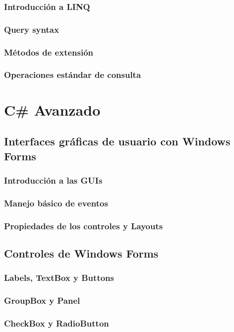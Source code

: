 \documentclass[12pt,a4paper]{report}
\begin{document}
\section{Introducción a LINQ}
\section{Query syntax}
\section{Métodos de extensión}
\section{Operaciones estándar de consulta}

\part{C\# Avanzado}
\chapter{ Interfaces gráficas de usuario con Windows Forms}
\section{Introducción a las GUIs}
\section{Manejo básico de eventos}
\section{Propiedades de los controles y Layouts}

\chapter{Controles de Windows Forms}
\section{Labels, TextBox y Buttons}
\section{GroupBox y Panel}
\section{CheckBox y RadioButton}
\end{document}

